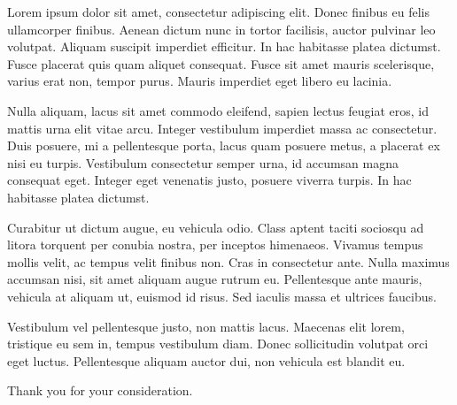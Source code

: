 \documentclass{modern-cv}       %
\begin{document}
\makecvheader[L]
\makelettertitle[R]

\begin{cvletter}
Lorem ipsum dolor sit amet, consectetur adipiscing elit. Donec finibus eu felis ullamcorper finibus. Aenean dictum nunc in tortor facilisis, auctor pulvinar leo volutpat. Aliquam suscipit imperdiet efficitur. In hac habitasse platea dictumst. Fusce placerat quis quam aliquet consequat. Fusce sit amet mauris scelerisque, varius erat non, tempor purus. Mauris imperdiet eget libero eu lacinia. \par\bigskip

Nulla aliquam, lacus sit amet commodo eleifend, sapien lectus feugiat eros, id mattis urna elit vitae arcu. Integer vestibulum imperdiet massa ac consectetur. Duis posuere, mi a pellentesque porta, lacus quam posuere metus, a placerat ex nisi eu turpis. Vestibulum consectetur semper urna, id accumsan magna consequat eget. Integer eget venenatis justo, posuere viverra turpis. In hac habitasse platea dictumst. \par\bigskip

Curabitur ut dictum augue, eu vehicula odio. Class aptent taciti sociosqu ad litora torquent per conubia nostra, per inceptos himenaeos. Vivamus tempus mollis velit, ac tempus velit finibus non. Cras in consectetur ante. Nulla maximus accumsan nisi, sit amet aliquam augue rutrum eu. Pellentesque ante mauris, vehicula at aliquam ut, euismod id risus. Sed iaculis massa et ultrices faucibus. \par\bigskip

Vestibulum vel pellentesque justo, non mattis lacus. Maecenas elit lorem, tristique eu sem in, tempus vestibulum diam. Donec sollicitudin volutpat orci eget luctus. Pellentesque aliquam auctor dui, non vehicula est blandit eu. \par\bigskip 

Thank you for your consideration. \par\bigskip
\end{cvletter}

\makeletterclosing %
\end{document}

